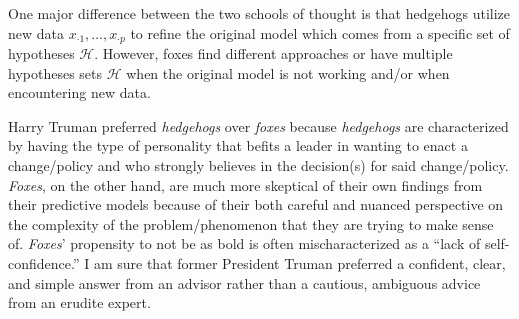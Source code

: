\documentclass[12pt]{article}
\begin{document}


\begin{enumerate}




\begin{tcolorbox}[colback=white, sharp corners]

One major difference between the two schools of thought is that hedgehogs utilize new data $x_{\cdot 1}, \ldots, x_{\cdot p}$ to refine the original model which comes from a specific set of hypotheses $\mathcal{H}$. However, foxes find different approaches or have multiple hypotheses sets $\mathcal{H}$ when the original model is not working and/or when encountering new data. 

\end{tcolorbox}


\begin{tcolorbox}[colback=white, sharp corners]

Harry Truman preferred \emph{hedgehogs} over \emph{foxes} because \emph{hedgehogs} are characterized by having the type of personality that befits a leader in wanting to enact a change/policy and who strongly believes in the decision(s) for said change/policy. \emph{Foxes}, on the other hand, are much more skeptical of their own findings from their predictive models because of their both careful and nuanced perspective on the complexity of the problem/phenomenon that they are trying to make sense of. \emph{Foxes}' propensity to not be as bold is often mischaracterized as a ``lack of self-confidence.'' I am sure that former President Truman preferred a confident, clear, and simple answer from an advisor rather than a cautious, ambiguous advice from an erudite expert.


\end{tcolorbox}
\end{enumerate}
\end{document}
